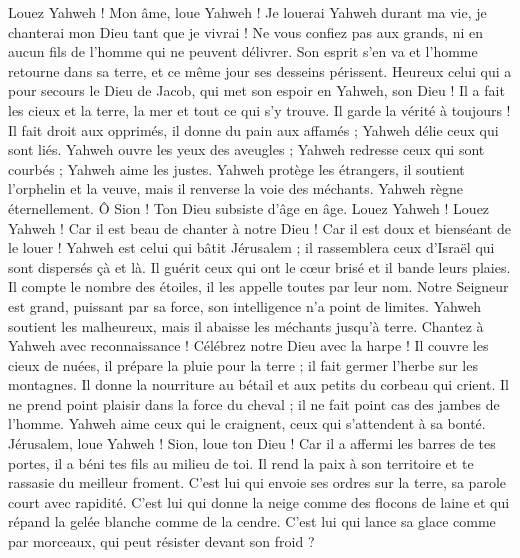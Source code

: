 \begin{multicols}{2}
\VerseOne{}Louez Yahweh ! Mon âme, loue Yahweh !
Je louerai Yahweh durant ma vie, je chanterai mon Dieu tant que je vivrai !
Ne vous confiez pas aux grands, ni en aucun fils de l’homme qui ne peuvent délivrer.
Son esprit s’en va et l'homme retourne dans sa terre, et ce même jour ses desseins périssent.
Heureux celui qui a pour secours le Dieu de Jacob, qui met son espoir en Yahweh, son Dieu !
Il a fait les cieux et la terre, la mer et tout ce qui s’y trouve. Il garde la vérité à toujours !
Il fait droit aux opprimés, il donne du pain aux affamés ; Yahweh délie ceux qui sont liés.
Yahweh ouvre les yeux des aveugles ; Yahweh redresse ceux qui sont courbés ; Yahweh aime les justes.
Yahweh protège les étrangers, il soutient l'orphelin et la veuve, mais il renverse la voie des méchants.
Yahweh règne éternellement. Ô Sion ! Ton Dieu subsiste d'âge en âge. Louez Yahweh !
\VerseOne{}Louez Yahweh ! Car il est beau de chanter à notre Dieu ! Car il est doux et bienséant de le louer !
Yahweh est celui qui bâtit Jérusalem ; il rassemblera ceux d'Israël qui sont dispersés çà et là.
Il guérit ceux qui ont le cœur brisé et il bande leurs plaies.
Il compte le nombre des étoiles, il les appelle toutes par leur nom.
Notre Seigneur est grand, puissant par sa force, son intelligence n’a point de limites.
Yahweh soutient les malheureux, mais il abaisse les méchants jusqu’à terre.
Chantez à Yahweh avec reconnaissance ! Célébrez notre Dieu avec la harpe !
Il couvre les cieux de nuées, il prépare la pluie pour la terre ; il fait germer l’herbe sur les montagnes.
Il donne la nourriture au bétail et aux petits du corbeau qui crient.
Il ne prend point plaisir dans la force du cheval ; il ne fait point cas des jambes de l'homme.
Yahweh aime ceux qui le craignent, ceux qui s'attendent à sa bonté.
Jérusalem, loue Yahweh ! Sion, loue ton Dieu !
Car il a affermi les barres de tes portes, il a béni tes fils au milieu de toi.
Il rend la paix à son territoire et te rassasie du meilleur froment.
C'est lui qui envoie ses ordres sur la terre, sa parole court avec rapidité.
C'est lui qui donne la neige comme des flocons de laine et qui répand la gelée blanche comme de la cendre.
C'est lui qui lance sa glace comme par morceaux, qui peut résister devant son froid ?

\end{multicols}
